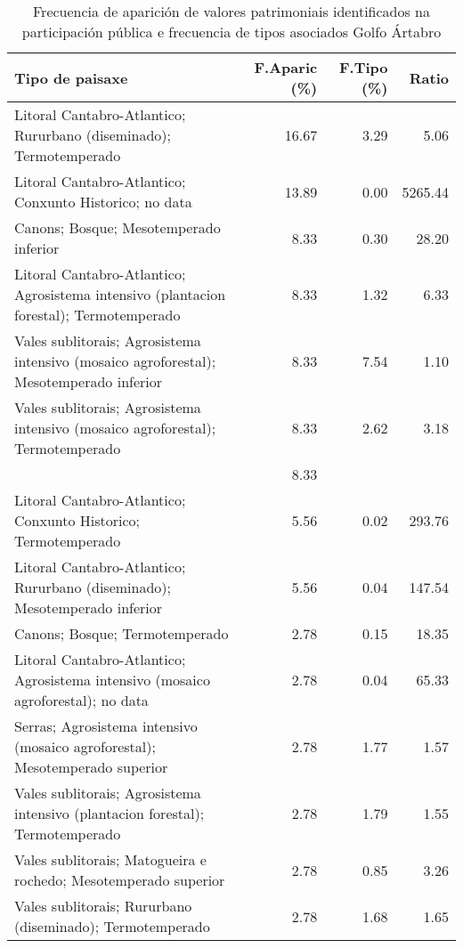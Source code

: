 \begin{table}[p]
\centering
\caption{Frecuencia de aparición de valores patrimoniais identificados na participación pública e frecuencia de tipos asociados Golfo Ártabro} 
\label{vsixotpat1}
\begin{tabular}{lrrr}
  \hline
Tipo de paisaxe & F.Aparic (\%) & F.Tipo (\%) & Ratio \\ 
  \hline
Litoral Cantabro-Atlantico; Rururbano (diseminado); Termotemperado & 16.67 & 3.29 & 5.06 \\ 
  Litoral Cantabro-Atlantico; Conxunto Historico; no data & 13.89 & 0.00 & 5265.44 \\ 
  Canons; Bosque; Mesotemperado inferior & 8.33 & 0.30 & 28.20 \\ 
  Litoral Cantabro-Atlantico; Agrosistema intensivo (plantacion forestal); Termotemperado & 8.33 & 1.32 & 6.33 \\ 
  Vales sublitorais; Agrosistema intensivo (mosaico agroforestal); Mesotemperado inferior & 8.33 & 7.54 & 1.10 \\ 
  Vales sublitorais; Agrosistema intensivo (mosaico agroforestal); Termotemperado & 8.33 & 2.62 & 3.18 \\ 
   & 8.33 &  &  \\ 
  Litoral Cantabro-Atlantico; Conxunto Historico; Termotemperado & 5.56 & 0.02 & 293.76 \\ 
  Litoral Cantabro-Atlantico; Rururbano (diseminado); Mesotemperado inferior & 5.56 & 0.04 & 147.54 \\ 
  Canons; Bosque; Termotemperado & 2.78 & 0.15 & 18.35 \\ 
  Litoral Cantabro-Atlantico; Agrosistema intensivo (mosaico agroforestal); no data & 2.78 & 0.04 & 65.33 \\ 
  Serras; Agrosistema intensivo (mosaico agroforestal); Mesotemperado superior & 2.78 & 1.77 & 1.57 \\ 
  Vales sublitorais; Agrosistema intensivo (plantacion forestal); Termotemperado & 2.78 & 1.79 & 1.55 \\ 
  Vales sublitorais; Matogueira e rochedo; Mesotemperado superior & 2.78 & 0.85 & 3.26 \\ 
  Vales sublitorais; Rururbano (diseminado); Termotemperado & 2.78 & 1.68 & 1.65 \\ 
   \hline
\end{tabular}
\end{table}
